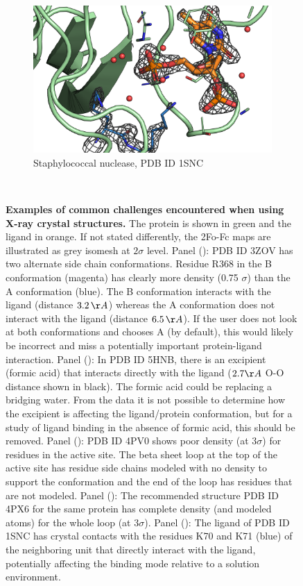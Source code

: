 \documentclass[9pt,bestpractices]{livecoms}
\begin{document}
\begin{figure}
    \begin{subfigure}[b]{0.48\textwidth}
        \centering
        \includegraphics[width=\textwidth]{figures/crystal/pic_1snc.png}
        \caption{Staphylococcal nuclease, PDB ID 1SNC}
        \label{fig:1snc}
    \end{subfigure}
    \hfill ~\\
    
    \caption{
    \textbf{Examples of common challenges encountered when using X-ray crystal structures.}
    The protein is shown in green and the ligand in orange. If not stated differently, the 2Fo-Fc maps are illustrated as grey isomesh at $2\sigma$ level. 
    Panel (): PDB ID 3ZOV has two
    alternate side chain conformations. Residue R368 in the B conformation (magenta) has clearly more density (0.75 $\sigma$) than the A conformation (blue). The B conformation interacts with the ligand (distance $3.2\,\AA$) whereas the A conformation does not interact with the ligand (distance $6.5\,\AA$). If the user does not look at both conformations and chooses A (by default), this would likely be incorrect and miss a potentially important protein-ligand interaction.  
    Panel (): In PDB ID 5HNB, there is an excipient (formic acid) that interacts directly with the ligand ($2.7 \AA$ O-O distance shown in black).  The formic acid could be replacing a bridging water.  From the data it is not possible to determine how the excipient is affecting the ligand/protein conformation, but for a study of ligand binding in the absence of formic acid, this should be removed.
    Panel (): PDB ID 4PV0  shows poor density (at $3\sigma$) for residues in the active site.  The beta sheet loop at the top of the active site has residue side chains modeled with no density to support the conformation and the end of the loop has residues that are not modeled.  
    Panel (): The recommended structure PDB ID 4PX6 for the same protein  has complete density (and modeled atoms) for the whole loop (at $3\sigma$).
    Panel (): The ligand of PDB ID 1SNC has crystal contacts with the residues K70 and K71 (blue) of the neighboring unit that directly interact with the ligand, potentially affecting the binding mode relative to a solution environment.
    }
    \label{fig:crystal1}
\end{figure}
\end{document}
